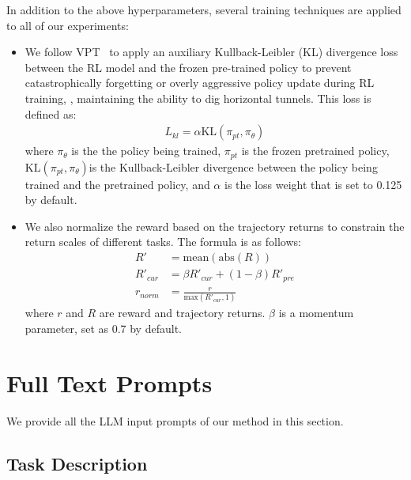\begin{onecolumn}
In addition to the above hyperparameters, several training techniques are applied to all of our experiments:
\begin{itemize}
    \item We follow VPT~\cite{baker2022video} to apply an auxiliary Kullback-Leibler (KL) divergence loss between the RL model and the frozen pre-trained policy to prevent catastrophically forgetting or overly aggressive policy update during RL training, \eg, maintaining the ability to dig horizontal tunnels. This loss is defined as:
    \begin{equation}
        \begin{aligned}
            L_{kl} = \alpha \text{KL}(\pi_{pt}, \pi_{\theta})
        \end{aligned}
    \end{equation}
    where $\pi_{\theta}$ is the the policy being trained, $\pi_{pt}$ is the frozen pretrained policy, $\text{KL}(\pi_{pt}, \pi_{\theta})$is the Kullback-Leibler divergence between the policy being trained and the pretrained policy, and $\alpha$ is the loss weight that is set to 0.125 by default.
    \item We also normalize the reward based on the trajectory returns to constrain the return scales of different tasks. The formula is as follows:
        \begin{equation}
            \begin{aligned}
                R' &= \text{mean}(\text{abs}(R)) \\
                R'_{cur} &= \beta R'_{cur} + (1-\beta) R'_{pre} \\
                r_{norm} &= \frac{r}{\text{max}(R'_{cur}, 1)}
            \end{aligned}
        \end{equation}
        where $r$ and $R$ are reward and trajectory returns. $\beta$ is a momentum parameter, set as 0.7 by default.
\end{itemize}






\clearpage
\section{Full Text Prompts}

We provide all the LLM input prompts of our method in this section. 

\subsection{Task Description}


\end{onecolumn}
